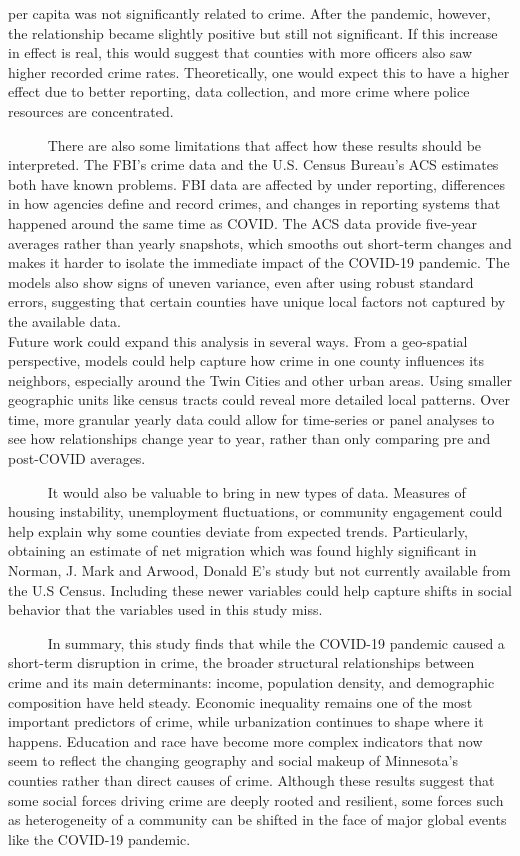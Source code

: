 \documentclass[
  11pt,
  letterpaper,
  DIV=11,
  numbers=noendperiod]{scrartcl}
\begin{document}
per capita was not significantly related to crime. After the pandemic,
however, the relationship became slightly positive but still not
significant. If this increase in effect is real, this would suggest that
counties with more officers also saw higher recorded crime rates.
Theoretically, one would expect this to have a higher effect due to
better reporting, data collection, and more crime where police resources
are concentrated.\\
\strut ~~~~~ There are also some limitations that affect how these
results should be interpreted. The FBI's crime data and the U.S. Census
Bureau's ACS estimates both have known problems. FBI data are affected
by under reporting, differences in how agencies define and record
crimes, and changes in reporting systems that happened around the same
time as COVID. The ACS data provide five-year averages rather than
yearly snapshots, which smooths out short-term changes and makes it
harder to isolate the immediate impact of the COVID-19 pandemic. The
models also show signs of uneven variance, even after using robust
standard errors, suggesting that certain counties have unique local
factors not captured by the available data.\\
Future work could expand this analysis in several ways. From a
geo-spatial perspective, models could help capture how crime in one
county influences its neighbors, especially around the Twin Cities and
other urban areas. Using smaller geographic units like census tracts
could reveal more detailed local patterns. Over time, more granular
yearly data could allow for time-series or panel analyses to see how
relationships change year to year, rather than only comparing pre and
post-COVID averages.\\
\strut ~~~~~ It would also be valuable to bring in new types of data.
Measures of housing instability, unemployment fluctuations, or community
engagement could help explain why some counties deviate from expected
trends. Particularly, obtaining an estimate of net migration which was
found highly significant in Norman, J. Mark and Arwood, Donald E's study
but not currently available from the U.S Census. Including these newer
variables could help capture shifts in social behavior that the
variables used in this study miss.\\
\strut ~~~~~ In summary, this study finds that while the COVID-19
pandemic caused a short-term disruption in crime, the broader structural
relationships between crime and its main determinants: income,
population density, and demographic composition have held steady.
Economic inequality remains one of the most important predictors of
crime, while urbanization continues to shape where it happens. Education
and race have become more complex indicators that now seem to reflect
the changing geography and social makeup of Minnesota's counties rather
than direct causes of crime. Although these results suggest that some
social forces driving crime are deeply rooted and resilient, some forces
such as heterogeneity of a community can be shifted in the face of major
global events like the COVID-19 pandemic.
\end{document}
